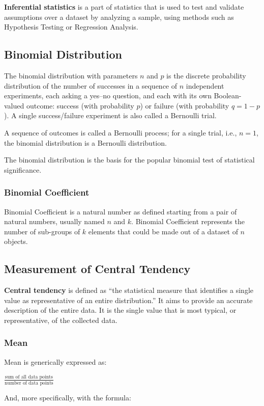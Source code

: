 \documentclass{article}
\begin{document}
\textbf{Inferential statistics} is a part of statistics that is used to test and validate assumptions over a dataset by analyzing a sample, using methods such as Hypothesis Testing or Regression Analysis.

\subsection{Binomial Distribution}
The binomial distribution with parameters $n$ and $p$ is the discrete probability distribution of the number of successes in a sequence of $n$ independent experiments, each asking a yes–no question, and each with its own Boolean-valued outcome: success (with probability $p$) or failure (with probability $q=1-p$). 
A single success/failure experiment is also called a Bernoulli trial. 

A sequence of outcomes is called a Bernoulli process; for a single trial, i.e., $n = 1$, the binomial distribution is a Bernoulli distribution. 

The binomial distribution is the basis for the popular binomial test of statistical significance.

\subsubsection{Binomial Coefficient}
Binomial Coefficient is a natural number as defined starting from a pair of natural numbers, usually named $n$ and $k$. 
Binomial Coefficient represents the number of sub-groups of $k$ elements that could be made out of a dataset of $n$ objects.

\subsection{Measurement of Central Tendency}
\textbf{Central tendency} is defined as “the statistical measure that identifies a single value as representative of an entire distribution.” It aims to provide an accurate description of the entire data. It is the single value that is most typical, or representative, of the collected data.

\subsubsection{Mean}
Mean is generically expressed as:

$\frac{\text{sum of all data points}}{\text{number of data points}}$

And, more specifically, with the formula:\\
\mbox{} \\
\end{document}
